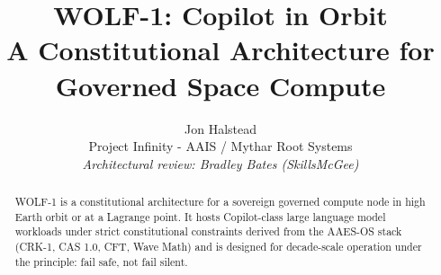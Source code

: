 \documentclass[conference]{IEEEtran}
\title{WOLF-1: Copilot in Orbit \\ A Constitutional Architecture for Governed Space Compute}
\author{
  Jon Halstead\\Project Infinity - AAIS / Mythar Root Systems\\[0.5em]
  \textit{Architectural review: Bradley Bates (SkillsMcGee)}
}
\begin{document}
\maketitle

\begin{abstract}
WOLF-1 is a constitutional architecture for a sovereign governed compute node in high Earth orbit or at a Lagrange point. It hosts Copilot-class large language model workloads under strict constitutional constraints derived from the AAES-OS stack (CRK-1, CAS 1.0, CFT, Wave Math) and is designed for decade-scale operation under the principle: fail safe, not fail silent.
\end{abstract}














\end{document}

